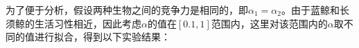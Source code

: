 \documentclass[UTF8]{ctexart}
\begin{document}
    \par 为了便于分析，假设两种生物之间的竞争力是相同的，即$\alpha _1=\alpha_2$。由于蓝鲸和长须鲸的生活习性相近，因此考虑$\alpha$的值在$[0.1,1]$范围内，这里对该范围内的$\alpha$取不同的值进行拟合，得到以下实验结果：
    \newpage
\end{document}
